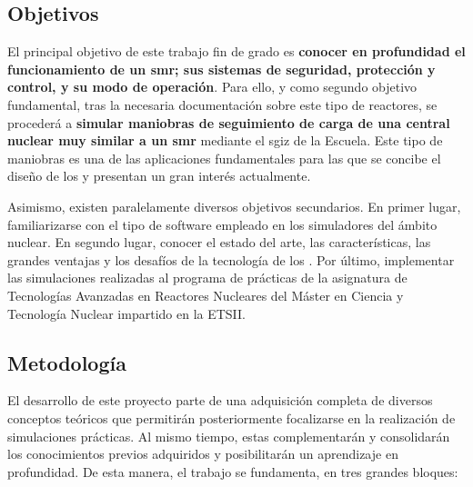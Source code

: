 \subsection{Objetivos}

El principal objetivo de este trabajo fin de grado es \textbf{conocer en profundidad el funcionamiento de un \acrshort{smr}; sus sistemas de seguridad, protección y control, y su modo de operación}. Para ello, y como segundo objetivo fundamental, tras la necesaria documentación sobre este tipo de reactores, se procederá a \textbf{simular maniobras de seguimiento de carga de una central nuclear muy similar a un \acrshort{smr}} mediante el \acrshort{sgiz} de la Escuela. Este tipo de maniobras es una de las aplicaciones fundamentales para las que se concibe el diseño de los  y presentan un gran interés actualmente.

Asimismo, existen paralelamente diversos objetivos secundarios. En primer lugar, familiarizarse con el tipo de software empleado en los simuladores del ámbito nuclear. En segundo lugar, conocer el estado del arte, las características, las grandes ventajas y los desafíos de la tecnología de los . Por último, implementar las simulaciones realizadas al programa de prácticas de la asignatura de Tecnologías Avanzadas en Reactores Nucleares del Máster en Ciencia y Tecnología Nuclear impartido en la ETSII.

\subsection{Metodología}

El desarrollo de este proyecto parte de una adquisición completa de diversos conceptos teóricos que permitirán posteriormente focalizarse en la realización de simulaciones prácticas. Al mismo tiempo, estas complementarán y consolidarán los conocimientos previos adquiridos y posibilitarán un aprendizaje en profundidad. De esta manera, el trabajo se fundamenta, en tres grandes bloques:

